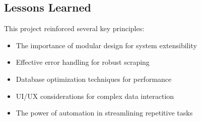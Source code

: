 \documentclass[12pt,a4paper]{article}
\begin{document}
\subsection{Lessons Learned}
This project reinforced several key principles:
\begin{itemize}
    \item The importance of modular design for system extensibility
    \item Effective error handling for robust scraping
    \item Database optimization techniques for performance
    \item UI/UX considerations for complex data interaction
    \item The power of automation in streamlining repetitive tasks
\end{itemize}
\end{document}
